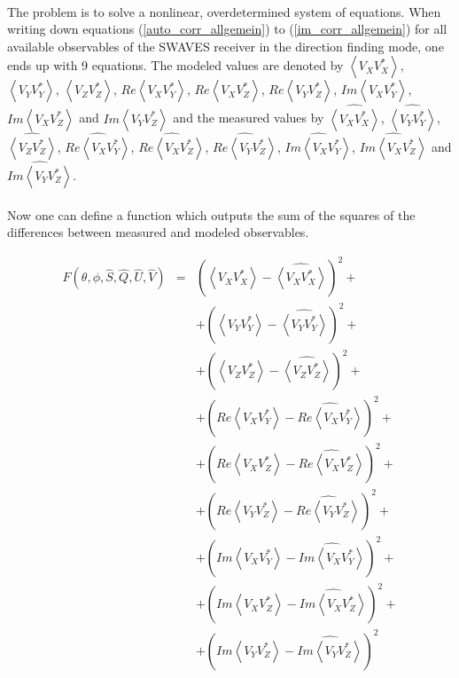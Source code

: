\documentclass[a4paper,10pt]{thesis}
\begin{document}
\paragraph{}
The problem is to solve a nonlinear, overdetermined system of equations. When writing down equations (\ref{auto_corr_allgemein}) to (\ref{im_corr_allgemein}) for all available observables of the SWAVES receiver in the direction finding mode, one ends up with 9 equations. The modeled values are denoted by  $\left\langle V_X V_X^{*} \right\rangle$,  $\left\langle V_Y V_Y^{*} \right\rangle$,  $\left\langle V_Z V_Z^{*} \right\rangle$,  $Re\left\langle V_X V_Y^{*} \right\rangle$, $Re\left\langle V_X V_Z^{*} \right\rangle$, $Re\left\langle V_Y V_Z^{*} \right\rangle$, $Im\left\langle V_X V_Y^{*} \right\rangle$, $Im\left\langle V_X V_Z^{*} \right\rangle$ and $Im\left\langle V_Y V_Z^{*} \right\rangle$ and the measured values by $\widehat{\left\langle V_X V_X^{*} \right\rangle}$,  $\widehat{\left\langle V_Y V_Y^{*} \right\rangle}$,  $\widehat{\left\langle V_Z V_Z^{*} \right\rangle}$,  $\widehat{Re\left\langle V_X V_Y^{*} \right\rangle}$, $\widehat{Re\left\langle V_X V_Z^{*} \right\rangle}$, $\widehat{Re\left\langle V_Y V_Z^{*} \right\rangle}$, $\widehat{Im\left\langle V_X V_Y^{*} \right\rangle}$, $\widehat{Im\left\langle V_X V_Z^{*} \right\rangle}$ and $\widehat{Im\left\langle V_Y V_Z^{*} \right\rangle}$.

\paragraph*{}
Now one can define a function which outputs the sum of the squares of the differences between measured and modeled observables.

\begin{eqnarray}
F(\theta , \phi, \hat{S},\hat{Q},\hat{U},\hat{V})&=&(\left\langle V_X V_X^{*} \right\rangle - \widehat{\left\langle V_X V_X^{*} \right\rangle})^2+\\
&&+(\left\langle V_Y V_Y^{*} \right\rangle - \widehat{\left\langle V_Y V_Y^{*} \right\rangle})^2 +\nonumber \\
&&+(\left\langle V_Z V_Z^{*} \right\rangle - \widehat{\left\langle V_Z V_Z^{*} \right\rangle})^2 +\nonumber \\
&&+(Re\left\langle V_X V_Y^{*} \right\rangle - \widehat{Re\left\langle V_X V_Y^{*} \right\rangle})^2 +\nonumber \\
&&+(Re\left\langle V_X V_Z^{*} \right\rangle - \widehat{Re\left\langle V_X V_Z^{*} \right\rangle})^2 +\nonumber \\
&&+(Re\left\langle V_Y V_Z^{*} \right\rangle - \widehat{Re\left\langle V_Y V_Z^{*} \right\rangle})^2 +\nonumber \\
&&+(Im\left\langle V_X V_Y^{*} \right\rangle - \widehat{Im\left\langle V_X V_Y^{*} \right\rangle})^2 +\nonumber \\
&&+(Im\left\langle V_X V_Z^{*} \right\rangle - \widehat{Im\left\langle V_X V_Z^{*} \right\rangle})^2 +\nonumber\\
&&+(Im\left\langle V_Y V_Z^{*} \right\rangle - \widehat{Im\left\langle V_Y V_Z^{*} \right\rangle})^2 \nonumber
\end{eqnarray}
\end{document}

